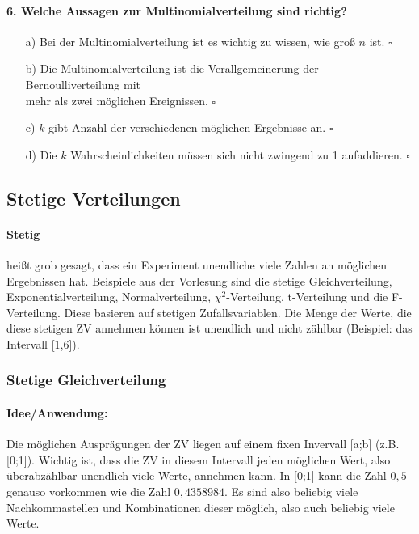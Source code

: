 \documentclass[a4paper]{article}
\begin{document}
\paragraph{6. Welche Aussagen zur Multinomialverteilung sind richtig?}
\begin{itemize}
    \item[a)] Bei der Multinomialverteilung ist es wichtig zu wissen, wie groß $n$ ist. \hfill $\square$
    \item[b)] Die Multinomialverteilung ist die Verallgemeinerung der Bernoulliverteilung mit\\ mehr als zwei möglichen Ereignissen. \hfill $\square$
    \item[c)] $k$ gibt Anzahl der verschiedenen möglichen Ergebnisse an. \hfill $\square$
    \item[d)] Die $k$ Wahrscheinlichkeiten müssen sich nicht zwingend zu 1 aufaddieren. \hfill $\square$
\end{itemize}
\clearpage


\subsection{Stetige Verteilungen} \label{sec:contdistr}

\paragraph{Stetig} heißt grob gesagt, dass ein Experiment unendliche viele Zahlen an möglichen Ergebnissen hat. Beispiele aus der Vorlesung sind die stetige Gleichverteilung, Exponentialverteilung, Normalverteilung, $\chi^2$-Verteilung, t-Verteilung und die F-Verteilung. Diese basieren auf stetigen Zufallsvariablen. Die Menge der Werte, die diese stetigen ZV annehmen können ist unendlich und nicht zählbar (Beispiel: das Intervall [1,6]). 

\subsubsection{Stetige Gleichverteilung}\label{sec:Uni}

\paragraph{Idee/Anwendung:} Die möglichen Ausprägungen der ZV liegen auf einem fixen Invervall [a;b] (z.B. [0;1]). Wichtig ist, dass die ZV in diesem Intervall jeden möglichen Wert, also überabzählbar unendlich viele Werte, annehmen kann. In [0;1] kann die Zahl $0,5$ genauso vorkommen wie die Zahl $0,4358984$. Es sind also beliebig viele Nachkommastellen und Kombinationen dieser möglich, also auch beliebig viele Werte. \\
\end{document}
